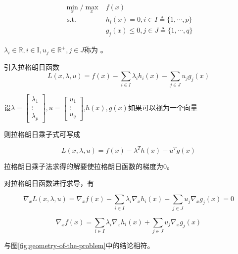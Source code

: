 \begin{definition}
    $$\begin{aligned}
        \min _{x} / \max_{x}& f(x) \\
\text{ s.t. } & h_{i}(x)=0, i \in I \triangleq\{1, \cdots, p\} \\
&g_{j}(x) \leq 0, j \in J \triangleq\{1, \cdots, q\}
    \end{aligned}$$

$ \lambda_{i} \in \mathbb{R}, i \in \mathrm{I}, u_{j} \in \mathbb{R}^{+}, j \in J $称为 。

引入拉格朗日函数 $$ L(x, \lambda, u)=f(x)-\sum_{i \in I} \lambda_{i} h_{i}(x)-\sum_{j \in J} u_{j} g_{j}(x)   $$

设$\lambda=\left[\begin{array}{c}\lambda_{1} \\ \vdots \\ \lambda_{p}\end{array}\right], u=\left[\begin{array}{c}u_{1} \\ \vdots \\ u_{q}\end{array}\right]$,$h(x),g(x)$如果可以视为一个向量

则拉格朗日乘子式可写成


$$ L(x, \lambda, u)=f(x) - \lambda^T h(x) - u^T g(x)$$

拉格朗日乘子法求得的解要使拉格朗日函数的梯度为0。

\end{definition}

\begin{theorem}[拉格朗日函数求导]
    对拉格朗日函数进行求导，有

$$ \nabla_{x} L(x, \lambda, u)=\nabla_{x} f(x)-\sum_{i \in I} \lambda_{i} \nabla_{x} h_{i}(x)-\sum_{j \in J} u_{j} \nabla_{x} g_{j}(x)=0 $$

$$\nabla_{x} f(x)=\sum_{i \in I} \lambda_{i} \nabla_{x} h_{i}(x)+\sum_{j \in J} u_{j} \nabla_{x} g_{j}(x)$$

    与图\ref{fig:geometry-of-the-problem}中的结论相符。
\end{theorem}

